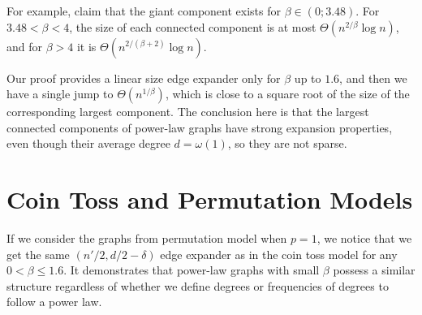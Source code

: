 For example, \cite{acl01,cl06} claim that the giant component exists for $\beta\in(0;3.48)$.
For $3.48<\beta<4$, the size of each connected component
is at most $\Theta\left(n^{2/\beta}\log n\right)$,
and for $\beta>4$ it is $\Theta\left(n^{2/(\beta+2)}\log n\right)$.

Our proof provides a linear size edge expander only for $\beta$ up to $1.6$,
and then we have a single jump to $\Theta\left(n^{1/\beta}\right)$, which is
close to a square root of the size of the corresponding largest component.
The conclusion here is that the largest connected components
of power-law graphs have strong expansion properties,
even though their average degree $d=\omega(1)$, so they are not sparse.

\section{Coin Toss and Permutation Models}

If we consider the graphs from permutation model when $p=1$,
we notice that we get the same $(n'/2,d/2-\delta)$ edge expander
as in the coin toss model for any $0<\beta\leq 1.6$.
It demonstrates that power-law graphs with small $\beta$ possess
a similar structure regardless of whether we define
degrees or frequencies of degrees to follow a power law.
